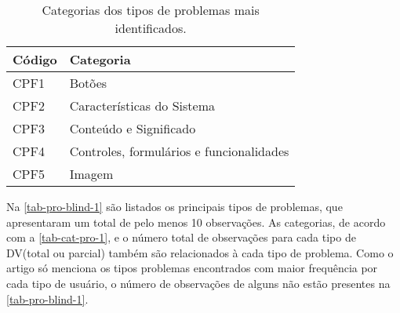 \begin{table}[htb]
  \begin{center}
    \ABNTEXfontereduzida
    \caption{Categorias dos tipos de problemas mais identificados.}
    \label{tab-cat-pro-1}
    \begin{tabular}{p{2.0cm}|p{7cm}}
      \textbf{Código} & \textbf{Categoria}                       \\
      \hline
      CPF1            & Botões                                   \\
      \hline
      CPF2            & Características do Sistema               \\
      \hline
      CPF3            & Conteúdo e Significado                   \\
      \hline
      CPF4            & Controles, formulários e funcionalidades \\
      \hline
      CPF5            & Imagem                                   \\
    \end{tabular}
  \end{center}
\end{table}

Na \autoref{tab-pro-blind-1} são listados os principais tipos de problemas, que apresentaram um total de pelo menos 10 observações.
As categorias, de acordo com a \autoref{tab-cat-pro-1}, e o número total de observações para cada tipo de DV\@ (total ou parcial) também são relacionados à cada tipo de problema.
Como o artigo só menciona os tipos problemas encontrados com maior frequência por cada tipo de usuário, o número de observações de alguns não estão presentes na \autoref{tab-pro-blind-1}.

